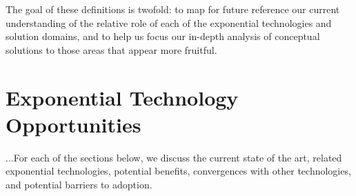 \documentclass[letter,11pt]{article}
\begin{document}
The goal of these definitions is twofold: to map for future reference
our current understanding of the relative role of each of the
exponential technologies and solution domains, and to help us focus our
in-depth analysis of conceptual solutions to those areas that appear
more fruitful.


\section{Exponential Technology Opportunities}

$\ldots$For each of the sections below, we discuss the current state of the art,
related exponential technologies, potential benefits, convergences with other
technologies, and potential barriers to adoption.

\secttoc



\clearpage
{}
{}
\nocite{*}



\clearpage
{}
{}
\printglossaries

\clearpage
{}
{}
\printindex
\end{document}
